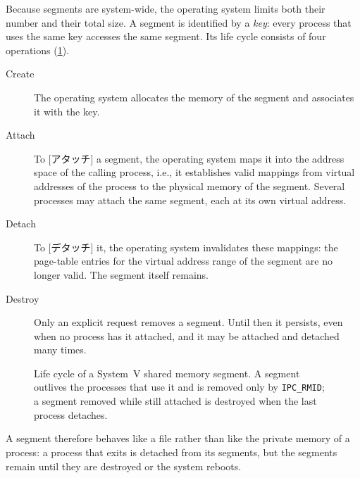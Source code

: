 \documentclass[../main.tex]{subfiles}
\begin{document}
Because segments are system-wide, the operating system limits both their
number and their total size.  A segment is identified by a
\emph{key}: every process that uses the same key accesses the same segment.
Its life cycle consists of four operations (\cref{fig:l09-sysv-lifecycle}).
\begin{description}
  \item[Create] The operating system allocates the memory of the segment and
    associates it with the key.
  \item[Attach] To [アタッチ] a segment, the operating system
    maps it into the address space of the calling process, i.e., it establishes valid
    mappings from virtual
    addresses of the process to the physical memory of the segment.  Several
    processes may attach the same segment, each at its own virtual address.
  \item[Detach] To [デタッチ] it, the operating system
    invalidates these mappings: the
    page-table entries for the virtual address range of the segment are no
    longer valid.  The segment itself remains.
  \item[Destroy] Only an explicit request removes a segment.  Until then it
    persists, even when no process has it attached, and it may be attached
    and detached many times.
\end{description}

\begin{figure}[htbp]
  \centering
  
  \caption{Life cycle of a System~V shared memory segment.  A segment
    outlives the processes that use it and is removed only by
    \texttt{IPC\_RMID}; a segment removed while still attached is destroyed
    when the last process detaches.}
  \label{fig:l09-sysv-lifecycle}
\end{figure}

A segment therefore behaves like a file rather than like the private memory
of a process: a process that exits is detached from its segments, but the
segments remain until they are destroyed or the system
reboots.
\end{document}
